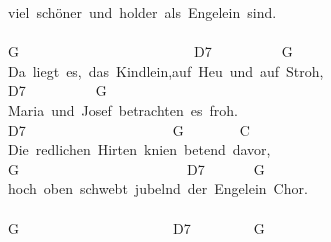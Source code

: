 \documentclass[]{book}
\begin{document}
viel~schöner~und~holder~als~Engelein~sind.\\
~\\
\hspace*{0.333em}\hspace*{0.333em}\hspace*{0.333em}G~~~~~~~~~~~~~~~~~~~~~~~~~D7~~~~~~~~~~G~~~~\\
Da~liegt~es,~das~Kindlein,auf~Heu~und~auf~Stroh,\\
\hspace*{0.333em}\hspace*{0.333em}\hspace*{0.333em}\hspace*{0.333em}\hspace*{0.333em}\hspace*{0.333em}\hspace*{0.333em}\hspace*{0.333em}\hspace*{0.333em}\hspace*{0.333em}\hspace*{0.333em}\hspace*{0.333em}\hspace*{0.333em}\hspace*{0.333em}\hspace*{0.333em}\hspace*{0.333em}\hspace*{0.333em}\hspace*{0.333em}D7~~~~~~~~~~G~~~~~\\
Maria~und~Josef~betrachten~es~froh.\\
\hspace*{0.333em}\hspace*{0.333em}\hspace*{0.333em}\hspace*{0.333em}D7~~~~~~~~~~~~~~~~~~~~~G~~~~~~~~C~~~~~~\\
Die~redlichen~Hirten~knien~betend~davor,\\
\hspace*{0.333em}\hspace*{0.333em}\hspace*{0.333em}\hspace*{0.333em}\hspace*{0.333em}G~~~~~~~~~~~~~~~~~~~~~~~~D7~~~~~~~G~~~~~\\
hoch~oben~schwebt~jubelnd~der~Engelein~Chor.\\
~\\
\hspace*{0.333em}\hspace*{0.333em}G~~~~~~~~~~~~~~~~~~~~~~D7~~~~~~~~~G~~~~\\
\end{document}
